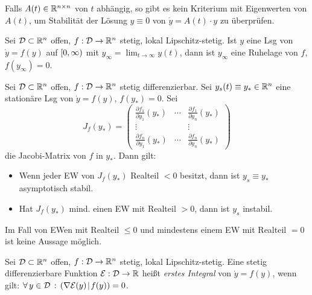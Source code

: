 \documentclass{cheat-sheet}
\newcommand{\D}{\mathcal{D}}
\newcommand{\E}{\mathcal{E}}
\newcommand{\scp}[2]{\left( #1 \!\mid\! #2 \right)} %
\begin{document}

\begin{bem}
  Falls $A(t) \in \mathbb{R}^{n \times n}$ von $t$ abhängig, so gibt es kein Kriterium mit Eigenwerten von $A(t)$, um Stabilität der Lösung $y \equiv 0$ von $\dot{y} = A(t) \cdot y$ zu überprüfen.
\end{bem}


\begin{lem}
  Sei $\D \subset \R^n$ offen, $f : \D \to \R^n$ stetig, lokal Lipschitz-stetig. Ist $y$ eine Lsg von $\dot{y} = f(y)$ auf $\left[ 0, \infty \right)$ mit $y_{\infty} = \lim_{t \to \infty} y(t)$, dann ist $y_{\infty}$ eine Ruhelage von $f$, \dh{} $f(y_{\infty}) = 0$.
\end{lem}

\begin{satz}
  Sei $\D \subset \R^n$ offen, $f : \D \to \R^n$ stetig differenzierbar. Sei $y_s(t) \equiv y_{*} \in \mathbb{R}^n$ eine stationäre Lsg von $\dot{y} = f(y)$, \dh{} $f(y_{*}) = 0$. Sei
  \[
    J_f(y_{*}) = \begin{pmatrix}
      \frac{\partial f_1}{\partial y_1}(y_{*}) & \cdots & \frac{\partial f_1}{\partial y_n} (y_{*}) \\
      \vdots & & \vdots \\
      \frac{\partial f_n}{\partial y_1} (y_{*}) & \cdots & \frac{\partial f_n}{\partial y_n} (y_{*})
    \end{pmatrix}
  \]
  die Jacobi-Matrix von $f$ in $y_{*}$. Dann gilt:
  \begin{itemize}
    \item Wenn jeder EW von $J_f(y_{*})$ Realteil $< 0$ besitzt, dann ist $y_s \equiv y_{*}$ asymptotisch stabil.
    \item Hat $J_f(y_{*})$ mind. einen EW mit Realteil $> 0$, dann ist $y_s$ instabil.
  \end{itemize}
\end{satz}


\begin{bem}
  Im Fall von EWen mit Realteil $\leq 0$ und mindestens einem EW mit Realteil $= 0$ ist keine Aussage möglich.
\end{bem}


\begin{defn}
  Sei $\D \subset \R^n$ offen, $f : \D \to \R^n$ stetig, lokal Lipschitz-stetig. Eine stetig differenzierbare Funktion $\E : \D \to \R$ heißt \emph{erstes Integral} von $\dot{y} = f(y)$, wenn gilt: $\fa{y \in \D} \scp{\nabla \E(y)}{f(y)} = 0$.
\end{defn}
\end{document}
